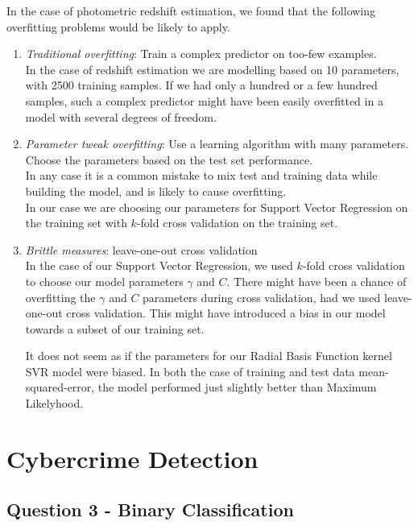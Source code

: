 \documentclass[12pt]{article}
\begin{document}
In the case of photometric redshift
estimation, we found that the following overfitting problems would be likely to apply.

\begin{enumerate}
	\item \textit{Traditional overfitting}: Train a complex predictor on too-few examples. \\
		In the case of redshift estimation we are modelling based on 10 parameters, with 2500 training samples. If we had only a hundred or a few hundred samples, such a complex predictor might have been easily overfitted in a model with several degrees of freedom.
	
	\item \textit{Parameter tweak overfitting}: Use a learning algorithm with many parameters. Choose the parameters based on the test set performance.\\
		In any case it is a common mistake to mix test and training data while building the model, and is likely to cause overfitting. \\
		In our case we are choosing our parameters for Support Vector Regression on the training set with $k$-fold cross validation on the training set.
		
	\item \textit{Brittle measures}: leave-one-out cross validation \\
		In the case of our Support Vector Regression, we used $k$-fold cross validation to choose our model parameters $\gamma$ and $C$. There might have been a chance of overfitting the $\gamma$ and $C$ parameters during cross validation, had we used leave-one-out cross validation. This might have introduced a bias in our model towards a subset of our training set.
		
		It does not seem as if the parameters for our Radial Basis Function kernel SVR model were biased. In both the case of training and test data mean-squared-error, the model performed just slightly better than Maximum Likelyhood.
		
\end{enumerate}

\newpage

\section{Cybercrime Detection}

\subsection{Question 3 - Binary Classification}
\end{document}
